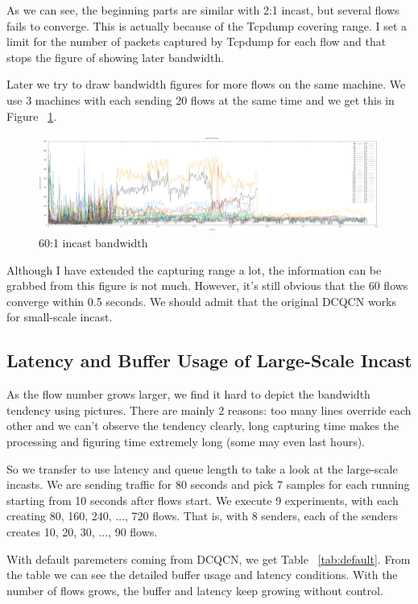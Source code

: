 \documentclass[12pt,a4paper]{article}
\begin{document}
As we can see, the beginning parts are similar with 2:1 incast, but several flows fails to converge.
This is actually because of the Tcpdump covering range.
I set a limit for the number of packets captured by Tcpdump for each flow and that stops the figure of showing later bandwidth.

Later we try to draw bandwidth figures for more flows on the same machine.
We use 3 machines with each sending 20 flows at the same time and we get this in Figure ~\ref{fig:3_20_0}.

\begin{figure}[h!]
	\begin{center}
		\includegraphics[width=6in]{3_20_0}
		\caption{60:1 incast bandwidth}
		\label{fig:3_20_0}
	\end{center}
\end{figure}

Although I have extended the capturing range a lot, the information can be grabbed from this figure is not much.
However, it's still obvious that the 60 flows converge within 0.5 seconds.
We should admit that the original DCQCN works for small-scale incast.

\subsection{Latency and Buffer Usage of Large-Scale Incast}
As the flow number grows larger, we find it hard to depict the bandwidth tendency using pictures.
There are mainly 2 reasons: too many lines override each other and we can't observe the tendency clearly, 
long capturing time makes the processing and figuring time extremely long (some may even last hours).

So we transfer to use latency and queue length to take a look at the large-scale incasts.
We are sending traffic for 80 seconds and pick 7 samples for each running starting from 10 seconds after flows start.
We execute 9 experiments, with each creating 80, 160, 240, ..., 720 flows.
That is, with 8 senders, each of the senders creates 10, 20, 30, ..., 90 flows.

With default paremeters coming from DCQCN, we get Table ~\ref{tab:default}.
From the table we can see the detailed buffer usage and latency conditions.
With the number of flows grows, the buffer and latency keep growing without control.
\end{document}
